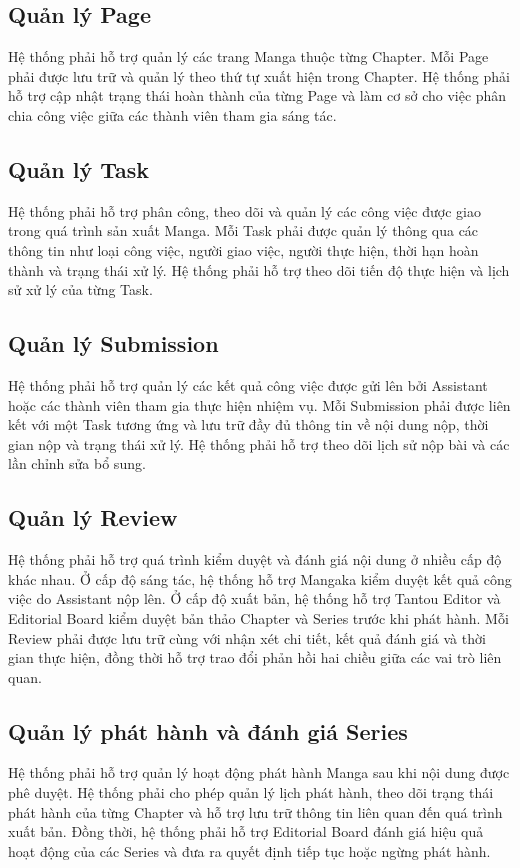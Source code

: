 \subsection{Quản lý Page}
Hệ thống phải hỗ trợ quản lý các trang Manga thuộc từng Chapter. Mỗi Page phải được lưu trữ và quản lý theo thứ tự xuất hiện trong Chapter. Hệ thống phải hỗ trợ cập nhật trạng thái hoàn thành của từng Page và làm cơ sở cho việc phân chia công việc giữa các thành viên tham gia sáng tác.

\subsection{Quản lý Task}
Hệ thống phải hỗ trợ phân công, theo dõi và quản lý các công việc được giao trong quá trình sản xuất Manga. Mỗi Task phải được quản lý thông qua các thông tin như loại công việc, người giao việc, người thực hiện, thời hạn hoàn thành và trạng thái xử lý. Hệ thống phải hỗ trợ theo dõi tiến độ thực hiện và lịch sử xử lý của từng Task.

\subsection{Quản lý Submission}
Hệ thống phải hỗ trợ quản lý các kết quả công việc được gửi lên bởi Assistant hoặc các thành viên tham gia thực hiện nhiệm vụ. Mỗi Submission phải được liên kết với một Task tương ứng và lưu trữ đầy đủ thông tin về nội dung nộp, thời gian nộp và trạng thái xử lý. Hệ thống phải hỗ trợ theo dõi lịch sử nộp bài và các lần chỉnh sửa bổ sung.

\subsection{Quản lý Review}
Hệ thống phải hỗ trợ quá trình kiểm duyệt và đánh giá nội dung ở nhiều cấp độ khác nhau. Ở cấp độ sáng tác, hệ thống hỗ trợ Mangaka kiểm duyệt kết quả công việc do Assistant nộp lên. Ở cấp độ xuất bản, hệ thống hỗ trợ Tantou Editor và Editorial Board kiểm duyệt bản thảo Chapter và Series trước khi phát hành. Mỗi Review phải được lưu trữ cùng với nhận xét chi tiết, kết quả đánh giá và thời gian thực hiện, đồng thời hỗ trợ trao đổi phản hồi hai chiều giữa các vai trò liên quan.

\subsection{Quản lý phát hành và đánh giá Series}
Hệ thống phải hỗ trợ quản lý hoạt động phát hành Manga sau khi nội dung được phê duyệt. Hệ thống phải cho phép quản lý lịch phát hành, theo dõi trạng thái phát hành của từng Chapter và hỗ trợ lưu trữ thông tin liên quan đến quá trình xuất bản. Đồng thời, hệ thống phải hỗ trợ Editorial Board đánh giá hiệu quả hoạt động của các Series và đưa ra quyết định tiếp tục hoặc ngừng phát hành.

